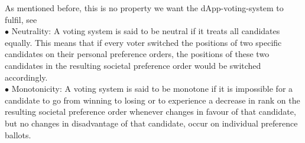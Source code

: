 As mentioned before, this is no property we want the dApp-voting-system to fulfil, see \\ %
$\bullet$ Neutrality: A voting system is said to be neutral if it treats all candidates equally. This means that if every voter switched the positions of two specific candidates on their personal preference orders, the positions of these two candidates in the resulting societal preference order would be switched accordingly. \\
$\bullet$ Monotonicity: A voting system is said to be monotone if it is impossible for a candidate to go from winning to losing or to experience a decrease in rank on the resulting societal preference order whenever changes in favour of that candidate, but no changes in disadvantage of that candidate, occur on individual preference ballots. \\

